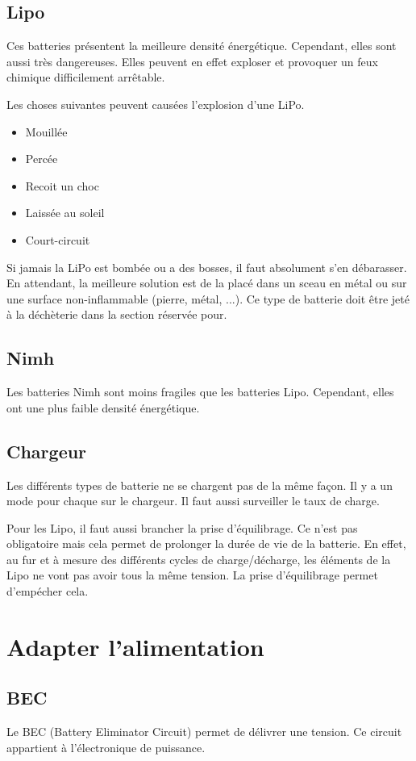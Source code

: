 \documentclass[a4paper, 11pt]{report}
\begin{document}
\subsection{Lipo}
Ces batteries présentent la meilleure densité énergétique. Cependant, elles sont aussi très dangereuses. Elles peuvent en effet exploser et provoquer un feux chimique difficilement arrêtable.

Les choses suivantes peuvent causées l'explosion d'une LiPo.
\begin{itemize}
\item Mouillée
\item Percée
\item Recoit un choc
\item Laissée au soleil
\item Court-circuit
\end{itemize}

Si jamais la LiPo est bombée ou a des bosses, il faut absolument s'en débarasser. En attendant, la meilleure solution est de la placé dans un sceau en métal ou sur une surface non-inflammable (pierre, métal, ...). Ce type de batterie doit être jeté à la déchèterie dans la section réservée pour.

\subsection{Nimh}
Les batteries Nimh sont moins fragiles que les batteries Lipo. Cependant, elles ont une plus faible densité énergétique.

\subsection{Chargeur}
Les différents types de batterie ne se chargent pas de la même façon. Il y a un mode pour chaque sur le chargeur. Il faut aussi surveiller le taux de charge.

Pour les Lipo, il faut aussi brancher la prise d'équilibrage. Ce n'est pas obligatoire mais cela permet de prolonger la durée de vie de la batterie. En effet, au fur et à mesure des différents cycles de charge/décharge, les éléments de la Lipo ne vont pas avoir tous la même tension. La prise d'équilibrage permet d'empécher cela.


\section{Adapter l'alimentation}

\subsection{BEC}
Le BEC (Battery Eliminator Circuit) permet de délivrer une tension. Ce circuit appartient à l'électronique de puissance.
\end{document}
